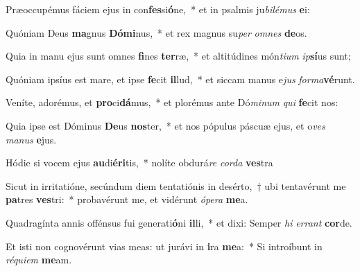 \item Præoccupémus fáciem ejus in con\textbf{fes}si\textbf{ó}ne,~* et in psalmis ju\textit{bi}\textit{lé}\textit{mus} \textbf{e}i:
\item Quóniam Deus \textbf{ma}gnus \textbf{Dó}\textbf{mi}nus,~* et rex magnus su\textit{per} \textit{om}\textit{nes} \textbf{de}os.
\item Quia in manu ejus sunt omnes \textbf{fi}nes \textbf{ter}ræ,~* et altitúdines món\textit{ti}\textit{um} \textit{ip}\textbf{sí}us sunt;
\item Quóniam ipsíus est mare, et ipse \textbf{fe}cit \textbf{il}lud,~* et siccam manus e\textit{jus} \textit{for}\textit{ma}\textbf{vé}runt.
\item Veníte, adorémus, et \textbf{pro}ci\textbf{dá}mus,~* et plorémus ante Dó\textit{mi}\textit{num} \textit{qui} \textbf{fe}cit nos:
\item Quia ipse est Dóminus \textbf{De}us \textbf{nos}ter,~* et nos pópulus páscuæ ejus, et o\textit{ves} \textit{ma}\textit{nus} \textbf{e}jus.
\item Hódie si vocem ejus \textbf{au}di\textbf{é}\textbf{ri}tis,~* nolíte obdurá\textit{re} \textit{cor}\textit{da} \textbf{ves}tra
\item Sicut in irritatióne, secúndum diem tentatiónis in desérto,~† ubi tentavérunt me \textbf{pa}tres \textbf{ves}tri:~* probavérunt me, et vidérunt \textit{ó}\textit{pe}\textit{ra} \textbf{me}a.
\item Quadragínta annis offénsus fui generati\textbf{ó}ni \textbf{il}li,~* et dixi: Semper \textit{hi} \textit{er}\textit{rant} \textbf{cor}de.
\item Et isti non cognovérunt vias meas: ut jurávi in \textbf{i}ra \textbf{me}a:~* Si introíbunt in \textit{ré}\textit{qui}\textit{em} \textbf{me}am.

